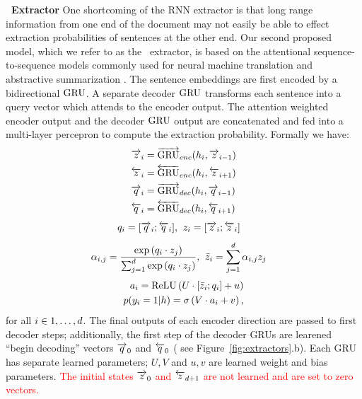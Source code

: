 \textbf{\sts~Extractor} One shortcoming of the RNN extractor is that long range
information from one end of the document may not easily be able to effect 
extraction probabilities of sentences at the other end. 
Our second proposed model, which we refer to as the \stsbf~extractor,
is based on the attentional sequence-to-sequence models commonly
used for neural machine translation \cite{badhanau} and 
abstractive summarization \cite{see}. The sentence embeddings are first
encoded by a bidirectional $\operatorname{GRU}$. A separate decoder $\operatorname{GRU}$ transforms each 
sentence into a query vector which attends to the encoder output. The
attention weighted encoder output and the decoder $\operatorname{GRU}$ output are concatenated
and fed into a multi-layer percepron to compute the extraction probability.
Formally we have:
\begin{align}
  \overrightarrow{z}_i &= \overrightarrow{\operatorname{GRU}}_{enc}(h_i, \overrightarrow{z}_{i-1}) \\
  \overleftarrow{z}_i &= \overleftarrow{\operatorname{GRU}}_{enc}(h_i, \overleftarrow{z}_{i+1}) \\
  \overrightarrow{q}_i &= \overrightarrow{\operatorname{GRU}}_{dec}(h_i, \overrightarrow{q}_{i-1}) \\
  \overleftarrow{q}_i &= \overleftarrow{\operatorname{GRU}}_{dec}(h_i, \overleftarrow{q}_{i+1}) 
\end{align}
\begin{align}
 q_i = [\overrightarrow{q}_i; \overleftarrow{q}_i], &\;\;
 z_i = [\overrightarrow{z}_i; \overleftarrow{z}_i] 
\end{align}
\begin{align}
 \alpha_{i,j} = 
   \frac{\exp \left(q_i \cdot z_j \right)}{
   \sum_{j=1}^{d}\exp\left(q_i \cdot z_j\right)}, 
& \;\; \bar{z}_i = \sum_{j=1}^{d} \alpha_{i,j} z_j 
\end{align}
\begin{align}
   a_i = \operatorname{ReLU}\left(U \cdot [\bar{z}_i; q_i] + u \right)&\\
   p(y_i=1|h) = \sigma\left(V\cdot a_i + v  \right),
\end{align}
for all $i \in 1, \ldots, d$.
The final outputs of each encoder direction are passed to first decoder
steps; additionally, the first step of the decoder GRUs are learened 
``begin decoding'' vectors $\overrightarrow{q}_0$ and $\overleftarrow{q}_0$ (
see Figure~\ref{fig:extractors}.b).
Each GRU has separate learned 
parameters; $U, V$ and $u, v$ are learned weight and bias parameters.
\textcolor{red}{The initial states $\overrightarrow{z}_0$ and $\overleftarrow{z}_{d + 1}$ are not 
learned and are set to zero vectors.}


